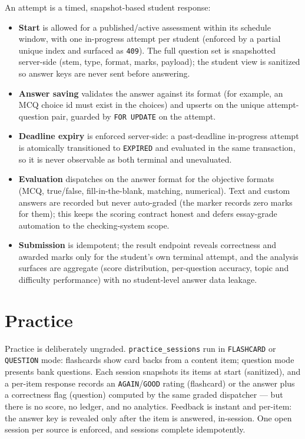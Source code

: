 An attempt is a timed, snapshot-based student response:
\begin{itemize}
  \item \textbf{Start} is allowed for a published/active assessment within its
  schedule window, with one in-progress attempt per student (enforced by a
  partial unique index and surfaced as \texttt{409}). The full question set is
  snapshotted server-side (stem, type, format, marks, payload); the student
  view is sanitized so answer keys are never sent before answering.
  \item \textbf{Answer saving} validates the answer against its format (for
  example, an MCQ choice id must exist in the choices) and upserts on the
  unique attempt-question pair, guarded by \texttt{FOR UPDATE} on the attempt.
  \item \textbf{Deadline expiry} is enforced server-side: a past-deadline
  in-progress attempt is atomically transitioned to \texttt{EXPIRED} and
  evaluated in the same transaction, so it is never observable as both
  terminal and unevaluated.
  \item \textbf{Evaluation} dispatches on the answer format for the objective
  formats (MCQ, true/false, fill-in-the-blank, matching, numerical). Text and
  custom answers are recorded but never auto-graded (the marker records zero
  marks for them); this keeps the scoring contract honest and defers
  essay-grade automation to the checking-system scope.
  \item \textbf{Submission} is idempotent; the result endpoint reveals
  correctness and awarded marks only for the student's own terminal attempt,
  and the analysis surfaces are aggregate (score distribution, per-question
  accuracy, topic and difficulty performance) with no student-level answer
  data leakage.
\end{itemize}

\section{Practice}

Practice is deliberately ungraded. \texttt{practice\_sessions} run in
\texttt{FLASHCARD} or \texttt{QUESTION} mode: flashcards show card backs from
a content item; question mode presents bank questions. Each session snapshots
its items at start (sanitized), and a per-item response records an
\texttt{AGAIN}/\texttt{GOOD} rating (flashcard) or the answer plus a
correctness flag (question) computed by the same graded dispatcher --- but there
is no score, no ledger, and no analytics. Feedback is instant and per-item:
the answer key is revealed only after the item is answered, in-session. One
open session per source is enforced, and sessions complete idempotently.

